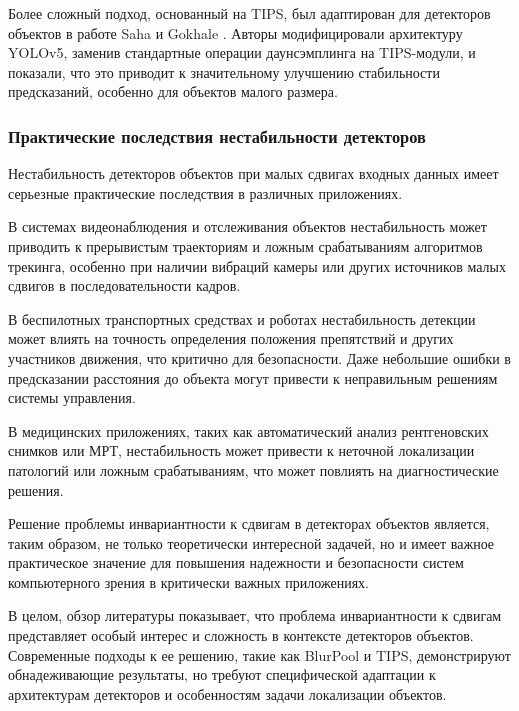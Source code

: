 Более сложный подход, основанный на TIPS, был адаптирован для детекторов объектов в работе Saha и Gokhale \cite{saha2024tips}. Авторы модифицировали архитектуру YOLOv5, заменив стандартные операции даунсэмплинга на TIPS-модули, и показали, что это приводит к значительному улучшению стабильности предсказаний, особенно для объектов малого размера.

\subsubsection{Практические последствия нестабильности детекторов}
\label{review:detectors:implications}

Нестабильность детекторов объектов при малых сдвигах входных данных имеет серьезные практические последствия в различных приложениях.

В системах видеонаблюдения и отслеживания объектов нестабильность может приводить к прерывистым траекториям и ложным срабатываниям алгоритмов трекинга, особенно при наличии вибраций камеры или других источников малых сдвигов в последовательности кадров.

В беспилотных транспортных средствах и роботах нестабильность детекции может влиять на точность определения положения препятствий и других участников движения, что критично для безопасности. Даже небольшие ошибки в предсказании расстояния до объекта могут привести к неправильным решениям системы управления.

В медицинских приложениях, таких как автоматический анализ рентгеновских снимков или МРТ, нестабильность может привести к неточной локализации патологий или ложным срабатываниям, что может повлиять на диагностические решения.

Решение проблемы инвариантности к сдвигам в детекторах объектов является, таким образом, не только теоретически интересной задачей, но и имеет важное практическое значение для повышения надежности и безопасности систем компьютерного зрения в критически важных приложениях.

В целом, обзор литературы показывает, что проблема инвариантности к сдвигам представляет особый интерес и сложность в контексте детекторов объектов. Современные подходы к ее решению, такие как BlurPool и TIPS, демонстрируют обнадеживающие результаты, но требуют специфической адаптации к архитектурам детекторов и особенностям задачи локализации объектов.

\newpage
